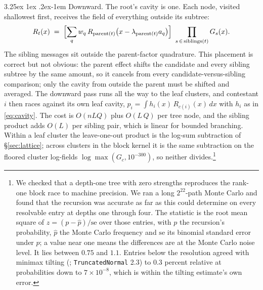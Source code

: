 \documentclass[11pt]{article}
\makeatletter
\renewcommand\paragraph{\@startsection{paragraph}{4}{\z@}%
  {3.25ex \@plus1ex \@minus.2ex}{-1em}%
  {\normalfont\normalsize\itshape}}
\makeatother
\begin{document}
\paragraph{Downward.} The root's cavity is one. Each node, visited shallowest
first, receives the field of everything outside its subtree:
\begin{equation}\label{eq:down}
R_t(x)\;=\;\Bigl[\sum_q w_q\,R_{\mathrm{parent}(t)}\!\left(x-\lambda_{\mathrm{parent}(t)}
a_q\right)\Bigr]\ \prod_{s\,\in\,\mathrm{siblings}(t)} G_s(x).
\end{equation}
The sibling messages sit outside the parent-factor quadrature. This
placement is correct but not obvious: the parent effect shifts the
candidate and every sibling subtree by the same amount, so it cancels
from every candidate-versus-sibling comparison; only the cavity from
outside the parent must be shifted and averaged. The downward pass runs
all the way to the leaf clusters, and contestant $i$ then races against its own leaf cavity,
$p_i=\int h_i(x)\,R_{c(i)}(x)\,dx$ with $h_i$ as in \eqref{eq:cavity}. The cost
is $O(nLQ)$ plus $O(L\,Q)$ per tree node, and the sibling product
adds $O(L)$ per sibling pair, which is linear for bounded branching.
Within a leaf cluster the leave-one-out product is the log-sum subtraction
of \S\ref{sec:lattice}; across clusters in the block kernel it is the same
subtraction on the floored cluster log-fields $\log\max(G_c,10^{-300})$,
so neither divides.\footnote{We checked that a depth-one tree with zero strengths reproduces the rank-one block race to machine
precision. We ran a long $2^{22}$-path Monte Carlo and found that the recursion was
accurate as far as this could determine on every resolvable
entry at depths one through four. The statistic is the root mean square
of $z=(p-\hat p)/\mathrm{se}$ over those entries, with $p$ the recursion's
probability, $\hat p$ the Monte Carlo frequency and $\mathrm{se}$ its
binomial standard error under $p$; a value near one means the
differences are at the Monte Carlo noise level. It lies between $0.75$
and $1.1$. Entries below the resolution agreed with minimax tilting
(\citealp{botev2017}; \texttt{TruncatedNormal} 2.3) to $0.3$ percent relative at probabilities down to
$7\times10^{-8}$, which is within the tilting estimate's own error.}
\end{document}
